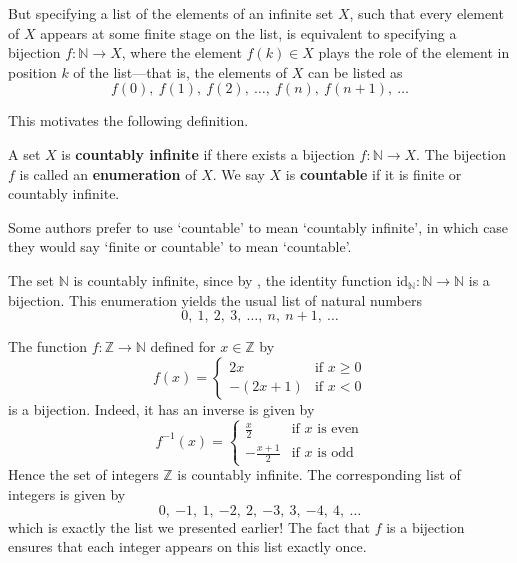 But specifying a list of the elements of an infinite set $X$, such that every element of $X$ appears at some finite stage on the list, is equivalent to specifying a bijection $f : \mathbb{N} \to X$, where the element $f(k) \in X$ plays the role of the element in position $k$ of the list---that is, the elements of $X$ can be listed as
\[  f(0),~ f(1),~ f(2),~ \dots,~ f(n),~ f(n+1),~ \dots \]

This motivates the following definition.

\begin{definition}
\label{defCountable}
A set $X$ is \textbf{countably infinite} if there exists a bijection $f : \mathbb{N} \to X$. The bijection $f$ is called an \textbf{enumeration} of $X$. We say $X$ is \textbf{countable} if it is finite or countably infinite.
\end{definition}

Some authors prefer to use `countable' to mean `countably infinite', in which case they would say `finite or countable' to mean `countable'.

\begin{example}
\label{exNIsCountable}
The set $\mathbb{N}$ is countably infinite, since by , the identity function $\mathrm{id}_{\mathbb{N}} : \mathbb{N} \to \mathbb{N}$ is a bijection. This enumeration yields the usual list of natural numbers
\[ 0,~ 1,~ 2,~ 3,~ \dots,~ n,~ n+1,~ \dots \]
\end{example}

\begin{example}
\label{exZIsCountable}
The function $f : \mathbb{Z} \to \mathbb{N}$ defined for $x \in \mathbb{Z}$ by
\[ f(x) = \begin{cases} 2x & \text{if } x \ge 0 \\ -(2x+1) & \text{if } x < 0 \end{cases} \]
is a bijection. Indeed, it has an inverse is given by
\[ f^{-1}(x) = \begin{cases} \frac{x}{2} & \text{if } x \text{ is even} \\ -\frac{x+1}{2} & \text{if } x \text{ is odd} \end{cases} \]
Hence the set of integers $\mathbb{Z}$ is countably infinite. The corresponding list of integers is given by
\[ 0,\ {-1},\ 1,\ {-2},\ 2,\ {-3},\ 3,\ {-4},\ 4,\ \dots \]
which is exactly the list we presented earlier! The fact that $f$ is a bijection ensures that each integer appears on this list exactly once.
\end{example}

